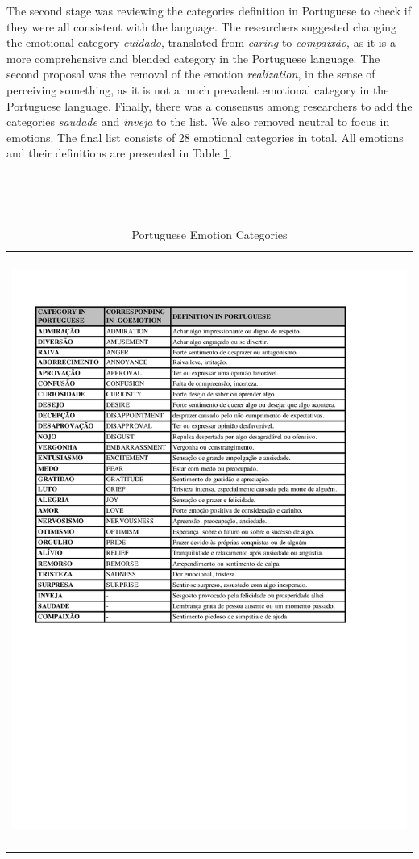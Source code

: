 \documentclass[12pt]{article}
\begin{document}
The second stage was reviewing the categories definition in Portuguese to check if they were all consistent with the language. The researchers suggested changing the emotional category \textit{cuidado}, translated from \textit{caring} to \textit{compaixão}, as it is a more comprehensive and blended category in the Portuguese language. The second proposal was the removal of the emotion \textit{realization}, in the sense of perceiving something, as it is not a much prevalent emotional category in the Portuguese language. Finally, there was a consensus among researchers to add the categories \textit{saudade} and \textit{inveja} to the list. We also removed neutral to focus in emotions. The final list consists of 28 emotional categories in total. All emotions and their definitions are presented in Table \ref{tab:emotion-categories}.

\begin{table}
  \caption{Portuguese Emotion Categories}
  \label{tab:emotion-categories}
  \begin{tabularx}{\textwidth}{X}
    \centering
    \includegraphics[trim=1.2cm 10.9cm 3.2cm 1.5cm, clip, scale=0.5]{img-n-tables/EMOCOES}
  \end{tabularx}
\end{table}
\end{document}

